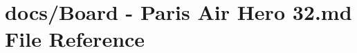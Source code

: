 \hypertarget{Board_01-_01Paris_01Air_01Hero_0132_8md}{\section{docs/\+Board -\/ Paris Air Hero 32.md File Reference}
\label{Board_01-_01Paris_01Air_01Hero_0132_8md}
}
